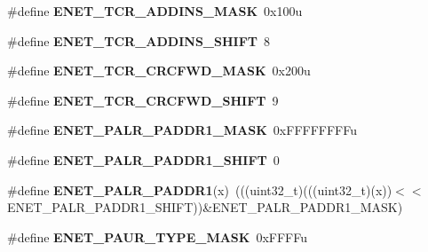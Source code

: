 \begin{DoxyCompactItemize}
\item 
\#define {\bfseries E\+N\+E\+T\+\_\+\+T\+C\+R\+\_\+\+A\+D\+D\+I\+N\+S\+\_\+\+M\+A\+SK}~0x100u\hypertarget{group__ENET__Register__Masks_gaeb5338e8af454ab3ef6c6941db06157b}{}\label{group__ENET__Register__Masks_gaeb5338e8af454ab3ef6c6941db06157b}

\item 
\#define {\bfseries E\+N\+E\+T\+\_\+\+T\+C\+R\+\_\+\+A\+D\+D\+I\+N\+S\+\_\+\+S\+H\+I\+FT}~8\hypertarget{group__ENET__Register__Masks_ga0cecb548325189373066c8844f4d9bc4}{}\label{group__ENET__Register__Masks_ga0cecb548325189373066c8844f4d9bc4}

\item 
\#define {\bfseries E\+N\+E\+T\+\_\+\+T\+C\+R\+\_\+\+C\+R\+C\+F\+W\+D\+\_\+\+M\+A\+SK}~0x200u\hypertarget{group__ENET__Register__Masks_gad9cf76ede816b109e58a7ad51288ef8f}{}\label{group__ENET__Register__Masks_gad9cf76ede816b109e58a7ad51288ef8f}

\item 
\#define {\bfseries E\+N\+E\+T\+\_\+\+T\+C\+R\+\_\+\+C\+R\+C\+F\+W\+D\+\_\+\+S\+H\+I\+FT}~9\hypertarget{group__ENET__Register__Masks_ga3332e52d1af57a1516fcb08b76c128ee}{}\label{group__ENET__Register__Masks_ga3332e52d1af57a1516fcb08b76c128ee}

\item 
\#define {\bfseries E\+N\+E\+T\+\_\+\+P\+A\+L\+R\+\_\+\+P\+A\+D\+D\+R1\+\_\+\+M\+A\+SK}~0x\+F\+F\+F\+F\+F\+F\+F\+Fu\hypertarget{group__ENET__Register__Masks_gac4233569659da9e3d013421bd1e12b49}{}\label{group__ENET__Register__Masks_gac4233569659da9e3d013421bd1e12b49}

\item 
\#define {\bfseries E\+N\+E\+T\+\_\+\+P\+A\+L\+R\+\_\+\+P\+A\+D\+D\+R1\+\_\+\+S\+H\+I\+FT}~0\hypertarget{group__ENET__Register__Masks_gad11fbf90382ecfe565772e12e3997557}{}\label{group__ENET__Register__Masks_gad11fbf90382ecfe565772e12e3997557}

\item 
\#define {\bfseries E\+N\+E\+T\+\_\+\+P\+A\+L\+R\+\_\+\+P\+A\+D\+D\+R1}(x)~(((uint32\+\_\+t)(((uint32\+\_\+t)(x))$<$$<$E\+N\+E\+T\+\_\+\+P\+A\+L\+R\+\_\+\+P\+A\+D\+D\+R1\+\_\+\+S\+H\+I\+FT))\&E\+N\+E\+T\+\_\+\+P\+A\+L\+R\+\_\+\+P\+A\+D\+D\+R1\+\_\+\+M\+A\+SK)\hypertarget{group__ENET__Register__Masks_ga990e2f0f1e734c1bfd249159926a49c3}{}\label{group__ENET__Register__Masks_ga990e2f0f1e734c1bfd249159926a49c3}

\item 
\#define {\bfseries E\+N\+E\+T\+\_\+\+P\+A\+U\+R\+\_\+\+T\+Y\+P\+E\+\_\+\+M\+A\+SK}~0x\+F\+F\+F\+Fu\hypertarget{group__ENET__Register__Masks_gac3d991850141898124542b0eafdd1419}{}\label{group__ENET__Register__Masks_gac3d991850141898124542b0eafdd1419}


\end{DoxyCompactItemize}
